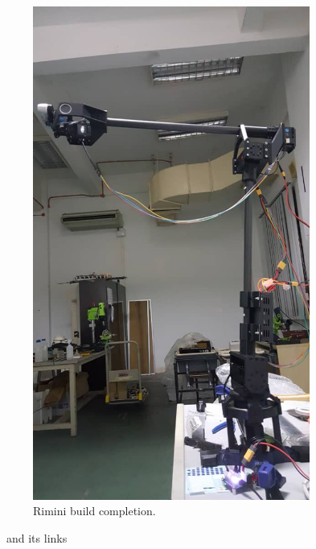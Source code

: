 \begin{figure}
\begin{subfigure}[c]{0.4\linewidth}
    \includegraphics[width=\linewidth]{r_mini_hw.jpeg}
    \caption{Rimini build completion.}
  \end{subfigure}

\caption{\rimini~and its links}
  \label{fig:rimini_links}
\end{figure}
